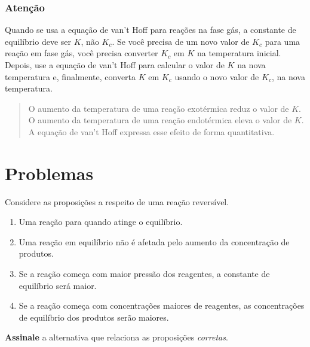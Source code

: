 \begin{warning}

\subsubsection{Atenção}

Quando se usa a equação de van't Hoff para reações na fase gás, a constante de equilíbrio deve ser \(K\), não \(K_c\). Se você precisa de um novo
valor de \(K_c\) para uma reação em fase gás, você precisa converter \(K_c\) em \(K\) na temperatura inicial. Depois, use a equação de van't Hoff para
calcular o valor de \(K\) na nova temperatura e, finalmente, converta \(K\) em \(K_c\) usando o novo valor de \(K_c\), na nova temperatura.

\end{warning}

\begin{quote}
O aumento da temperatura de uma reação exotérmica reduz o valor de \(K\). O aumento da temperatura de uma reação endotérmica eleva o valor de \(K\). A
equação de van't Hoff expressa esse efeito de forma quantitativa.
\end{quote}

\section*{Problemas}

\begin{problem}[
	id={2F01},
	path={/home/braun/Documents/Developer/braunchem/data/problems/Q2/2F/2F01}
]
Considere as proposições a respeito de uma reação reversível.

\begin{enumerate}
\def\labelenumi{\arabic{enumi}.}
\tightlist
\item
  Uma reação para quando atinge o equilíbrio.
\item
  Uma reação em equilíbrio não é afetada pelo aumento da concentração de produtos.
\item
  Se a reação começa com maior pressão dos reagentes, a constante de equilíbrio será maior.
\item
  Se a reação começa com concentrações maiores de reagentes, as concentrações de equilíbrio dos produtos serão maiores.
\end{enumerate}

\textbf{Assinale} a alternativa que relaciona as proposições \emph{corretas}.
\end{problem}



